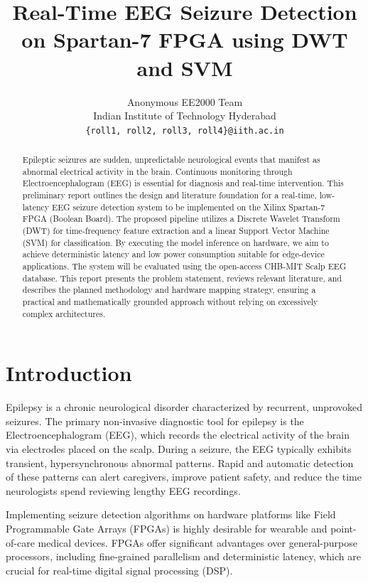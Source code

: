 \documentclass[10pt,twocolumn,letterpaper]{article}
\begin{document}
\title{Real-Time EEG Seizure Detection on Spartan-7 FPGA using DWT and SVM}

\author{
Anonymous EE2000 Team\\
Indian Institute of Technology Hyderabad\\
{\tt\small \{roll1, roll2, roll3, roll4\}@iith.ac.in}
}

\maketitle

\begin{abstract}
Epileptic seizures are sudden, unpredictable neurological events that manifest as abnormal electrical activity in the brain. Continuous monitoring through Electroencephalogram (EEG) is essential for diagnosis and real-time intervention. This preliminary report outlines the design and literature foundation for a real-time, low-latency EEG seizure detection system to be implemented on the Xilinx Spartan-7 FPGA (Boolean Board). The proposed pipeline utilizes a Discrete Wavelet Transform (DWT) for time-frequency feature extraction and a linear Support Vector Machine (SVM) for classification. By executing the model inference on hardware, we aim to achieve deterministic latency and low power consumption suitable for edge-device applications. The system will be evaluated using the open-access CHB-MIT Scalp EEG database. This report presents the problem statement, reviews relevant literature, and describes the planned methodology and hardware mapping strategy, ensuring a practical and mathematically grounded approach without relying on excessively complex architectures.
\end{abstract}

\section{Introduction}
Epilepsy is a chronic neurological disorder characterized by recurrent, unprovoked seizures. The primary non-invasive diagnostic tool for epilepsy is the Electroencephalogram (EEG), which records the electrical activity of the brain via electrodes placed on the scalp. During a seizure, the EEG typically exhibits transient, hypersynchronous abnormal patterns. Rapid and automatic detection of these patterns can alert caregivers, improve patient safety, and reduce the time neurologists spend reviewing lengthy EEG recordings.

Implementing seizure detection algorithms on hardware platforms like Field Programmable Gate Arrays (FPGAs) is highly desirable for wearable and point-of-care medical devices. FPGAs offer significant advantages over general-purpose processors, including fine-grained parallelism and deterministic latency, which are crucial for real-time digital signal processing (DSP). 
\end{document}
